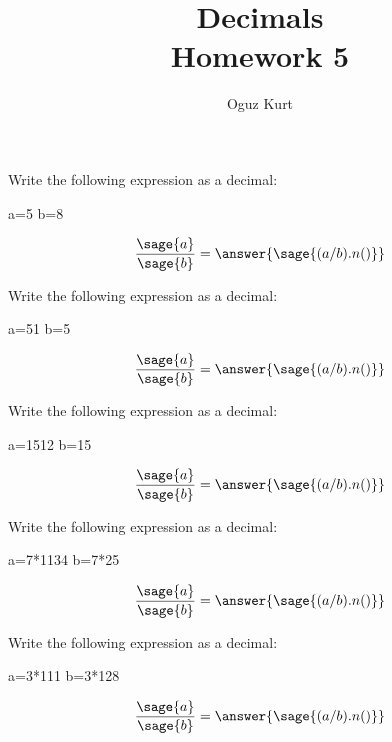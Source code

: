 \documentclass{ximera}
\title{Decimals\\ Homework 5}
\author{Oguz Kurt}
\begin{document}
\maketitle



\begin{problem}
Write the following expression as a decimal:
\begin{sagesilent}
a=5
b=8
\end{sagesilent}
\begin{prompt}
$$\frac{\sage{a}}{\sage{b}}=\answer{\sage{(a/b).n()}}$$
\end{prompt}
\end{problem}


\begin{problem}
Write the following expression as a decimal:
\begin{sagesilent}
a=51
b=5
\end{sagesilent}
\begin{prompt}
$$\frac{\sage{a}}{\sage{b}}=\answer{\sage{(a/b).n()}}$$
\end{prompt}
\end{problem}




\begin{problem}
Write the following expression as a decimal:
\begin{sagesilent}
a=1512
b=15
\end{sagesilent}
\begin{prompt}
$$\frac{\sage{a}}{\sage{b}}=\answer{\sage{(a/b).n()}}$$
\end{prompt}
\end{problem}



\begin{problem}
Write the following expression as a decimal:
\begin{sagesilent}
a=7*1134
b=7*25
\end{sagesilent}
\begin{prompt}
$$\frac{\sage{a}}{\sage{b}}=\answer{\sage{(a/b).n()}}$$
\end{prompt}
\end{problem}



\begin{problem}
Write the following expression as a decimal:
\begin{sagesilent}
a=3*111
b=3*128
\end{sagesilent}
\begin{prompt}
$$\frac{\sage{a}}{\sage{b}}=\answer{\sage{(a/b).n()}}$$
\end{prompt}
\end{problem}
\end{document}
